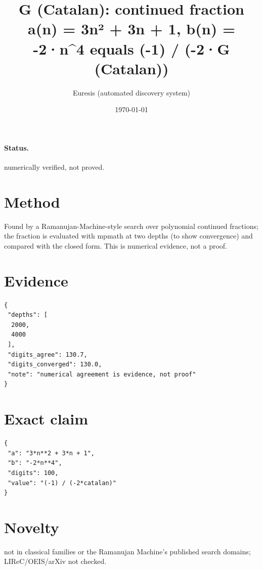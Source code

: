 \documentclass[11pt]{article}
\title{G (Catalan): continued fraction a(n) = 3n² + 3n + 1, b(n) = -2·n\^{}4 equals (-1) / (-2·G (Catalan))}
\author{Euresis (automated discovery system)}
\date{\today}
\begin{document}
\maketitle
\paragraph{Status.} numerically verified, not proved.
\section{Method}
Found by a Ramanujan-Machine-style search over polynomial continued fractions; the fraction is evaluated with mpmath at two depths (to show convergence) and compared with the closed form. This is numerical evidence, not a proof.
\section{Evidence}
\begin{verbatim}
{
 "depths": [
  2000,
  4000
 ],
 "digits_agree": 130.7,
 "digits_converged": 130.0,
 "note": "numerical agreement is evidence, not proof"
}
\end{verbatim}
\section{Exact claim}
\begin{verbatim}
{
 "a": "3*n**2 + 3*n + 1",
 "b": "-2*n**4",
 "digits": 100,
 "value": "(-1) / (-2*catalan)"
}
\end{verbatim}
\section{Novelty}
not in classical families or the Ramanujan Machine's published search domains; LIReC/OEIS/arXiv not checked.
\end{document}
